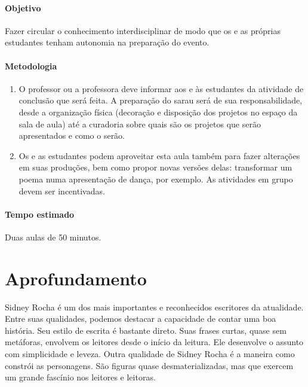 \documentclass[12pt]{extarticle}
\begin{document}
\paragraph{Objetivo} Fazer circular o conhecimento interdisciplinar de modo
que os e as próprias estudantes tenham autonomia na preparação do evento.


\paragraph{Metodologia}

\begin{enumerate}

  \item
  O professor ou a professora deve informar aos e às estudantes da atividade de conclusão que será feita.
  A preparação do sarau será de sua responsabilidade, desde a organização física
  (decoração e disposição dos projetos no espaço da sala de aula) até a curadoria
  sobre quais são os projetos que serão apresentados e como o serão.

  \item Os e as estudantes
  podem aproveitar esta aula também para fazer alterações em suas produções, bem 
  como propor novas versões delas: transformar um poema numa apresentação de dança, por exemplo.
  As atividades em grupo devem ser incentivadas. 

\end{enumerate}

\paragraph{Tempo estimado} Duas aulas de 50 minutos.


\section{Aprofundamento}

Sidney Rocha é um dos mais importantes e reconhecidos
escritores da atualidade. Entre suas qualidades, podemos destacar a capacidade
de contar uma boa história. Seu estilo de escrita é bastante direto. Suas
frases curtas, quase sem metáforas, envolvem os leitores desde o início da
leitura. Ele desenvolve o assunto com simplicidade e leveza. Outra qualidade de
Sidney Rocha é a maneira como constrói as personagens. São figuras quase
desmaterializadas, mas que exercem um grande fascínio nos leitores e leitoras. 
\end{document}
